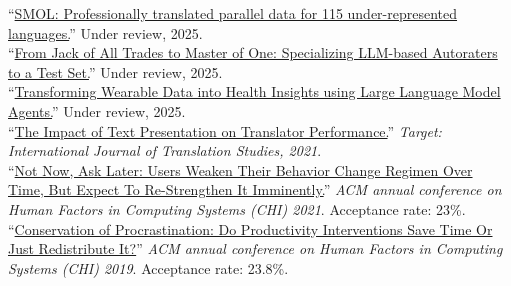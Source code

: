 ``\href{https://arxiv.org/pdf/2502.12301}{SMOL: Professionally translated parallel data for 115 under-represented languages.}'' Under review, 2025.\\

``\href{https://arxiv.org/pdf/2411.15387}{From Jack of All Trades to Master of One: Specializing LLM-based Autoraters to a Test Set.}'' Under review, 2025.\\

``\href{https://arxiv.org/pdf/2406.06464}{Transforming Wearable Data into Health Insights using Large Language Model Agents.}'' Under review, 2025.\\

``\href{https://arxiv.org/pdf/2011.05978.pdf}{The Impact of Text Presentation on Translator Performance.}'' \emph{Target: International Journal of Translation Studies, 2021}.\\

``\href{https://hci.stanford.edu/publications/2021/notnow/notnowasklater.pdf}{Not Now, Ask Later: Users Weaken Their Behavior Change Regimen Over Time, But Expect To Re-Strengthen It Imminently.}'' \emph{ACM annual conference on Human Factors in Computing Systems (CHI) 2021}. Acceptance rate: 23\%.\\ %

``\href{https://hci.stanford.edu/publications/2019/conservation/conservation-chi2019.pdf}{Conservation of Procrastination: Do Productivity Interventions Save Time Or Just Redistribute It?}'' \emph{ACM annual conference on Human Factors in Computing Systems (CHI) 2019}. Acceptance rate: 23.8\%.\\ %

